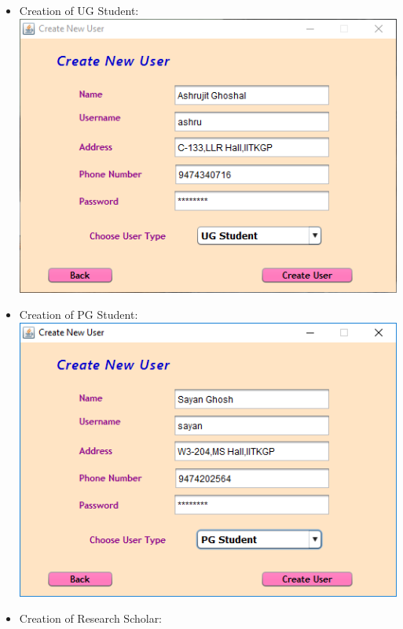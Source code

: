 \documentclass{article}
\begin{document}
\begin{enumerate}
\begin{itemize}
\begin{itemize}
\item Creation of UG Student:\\
\includegraphics[scale=0.8]{images/LibrarianLogin/Actions/CreateUser/CreateUGStudent.PNG}
\item Creation of PG Student:\\
\includegraphics[scale=0.8]{images/LibrarianLogin/Actions/CreateUser/CreatePGStudent.PNG}
\item Creation of Research Scholar:\\

\end{itemize}
\end{itemize}
\end{enumerate}
\end{document}
